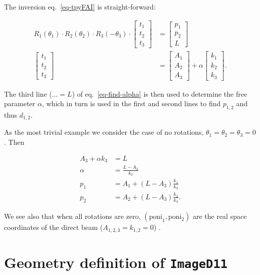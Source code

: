 \documentclass[12pt]{article}
\begin{document}
The inversion eq.~\ref{eq-tpyFAI} is straight-forward:

\begin{align}
  R_1(\theta_1)\cdot R_2(\theta_2) \cdot R_3(-\theta_3) \cdot
  \begin{bmatrix} t_1 \\ t_2 \\ t_3
  \end{bmatrix}
  & =
  \begin{bmatrix} p_1 \\ p_2 \\ L \end{bmatrix}
  \label{eq-find-alpha}
  \\
  \begin{bmatrix}
    t_1 \\ t_2 \\ t_3
  \end{bmatrix}
  & =
  \begin{bmatrix}
    A_1  \\ A_2 \\ A_3
  \end{bmatrix}
  + \alpha
  \begin{bmatrix}
    k_1 \\ k_2 \\ k_3
  \end{bmatrix}.
\end{align}

The third line ($\ldots = L$) of eq.~\ref{eq-find-alpha} is then used
to determine the free parameter $\alpha$, which in turn is used in the
first and second lines to find $p_{1,2}$ and thus $d_{1,2}$.

As the most trivial example we consider the case of no rotations,
$\theta_1 = \theta_2 = \theta_3 = 0$. Then

\begin{align}
  A_3 + \alpha k_3 & = L \\
  \alpha & = \frac{L-A_3}{k_3} \\
  p_1 & = A_1 + (L-A_3) \frac{k_1}{k_3} \\
  p_2 & = A_2 + (L-A_3) \frac{k_2}{k_3}.
\end{align}

We see also that when all rotations are zero, $(\mathrm{poni}_1,
\mathrm{poni_2})$ are the real space coordinates of the direct beam
($A_{1,2,3}=k_{1,2}=0$) .

\section{Geometry definition of \texttt{ImageD11}}
\end{document}

